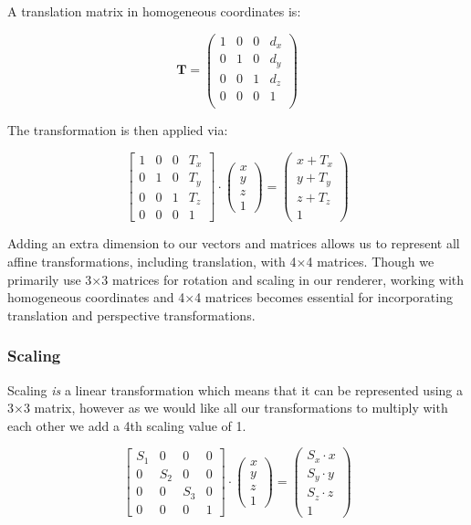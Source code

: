 \documentclass[12pt]{article}
\begin{document}
A translation matrix in homogeneous coordinates is:

\[
    \mathbf{T} = \begin{pmatrix}
        1 & 0 & 0 & d_x \\
        0 & 1 & 0 & d_y \\
        0 & 0 & 1 & d_z \\
        0 & 0 & 0 & 1   \\
    \end{pmatrix}
\]

The transformation is then applied via:

\[
    \begin{bmatrix}  1 & 0 & 0 & {T_x} \\ 0 & 1 & 0 & {T_y} \\ 0 & 0 & 1 & {T_z} \\ 0 & 0 & 0 & 1 \end{bmatrix} \cdot \begin{pmatrix} x \\ y \\ z \\ 1 \end{pmatrix} = \begin{pmatrix} x + {T_x} \\ y + {T_y} \\ z + {T_z} \\ 1 \end{pmatrix}
\]

Adding an extra dimension to our vectors and matrices allows us to represent all affine transformations, including translation, with 4$\times$4 matrices. Though we primarily use 3$\times$3 matrices for rotation and scaling in our renderer, working with homogeneous coordinates and 4$\times$4 matrices becomes essential for incorporating translation and perspective transformations.


\subsubsection{Scaling}

Scaling \textit{is} a linear transformation which means that it can be represented using a 3$\times$3 matrix, however as we would like all our transformations to multiply with each other we add a 4th scaling value of 1.

\[
    \begin{bmatrix}
        {S_1} & 0     & 0     & 0 \\
        0     & {S_2} & 0     & 0 \\
        0     & 0     & {S_3} & 0 \\
        0     & 0     & 0     & 1
    \end{bmatrix} \cdot
    \begin{pmatrix} x \\ y \\ z \\ 1 \end{pmatrix} =
    \begin{pmatrix} {S_x} \cdot x \\ {S_y} \cdot y \\ {S_z} \cdot z \\ 1 \end{pmatrix}
\]
\end{document}
